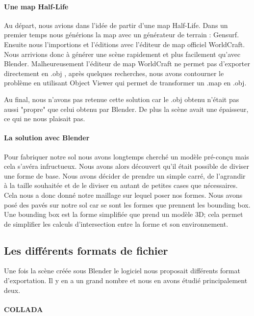 \documentclass[a4paper,12pt]{report}
\begin{document}
\paragraph{Une map Half-Life}

Au départ, nous avions dans l'idée de partir d'une map Half-Life. Dans un premier temps nous générions la map avec un générateur de terrain : Gensurf. Ensuite nous l'importions et l'éditions avec l'éditeur de map officiel WorldCraft. Nous arrivions donc à générer une scène rapidement et plus facilement qu'avec Blender. 
Malheureusement l'éditeur de map WorldCraft ne permet pas d'exporter directement en .obj , après quelques recherches, nous avons contourner le problème en utilisant Object Viewer qui permet de transformer un .map en .obj.

Au final, nous n'avons pas retenue cette solution car le .obj obtenu n'était pas aussi "propre" que celui obtenu par Blender. De plus la scène avait une épaisseur, ce qui ne nous plaisait pas.

\paragraph{La solution avec Blender}

Pour fabriquer notre sol nous avons longtemps cherché un modèle pré-conçu mais cela s'avéra infructueux.
Nous avons alors découvert qu'il était possible de diviser une forme de base. Nous avons décider de prendre un simple carré, de l'agrandir à la taille souhaitée et de le diviser en autant de petites cases que nécessaires. Cela nous a donc donné notre maillage sur lequel poser nos formes.
Nous avons posé des pavés sur notre sol car se sont les formes que prennent les bounding box. Une bounding box est la forme simplifiée que prend un modèle 3D; cela permet de simplifier les calculs d'intersection entre la forme et son environnement.

\subsection{Les différents formats de fichier}

Une fois la scène créée sous Blender le logiciel nous proposait différents format d'exportation. Il y en a un grand nombre et nous en avons étudié principalement deux.

\paragraph{COLLADA}
\end{document}
